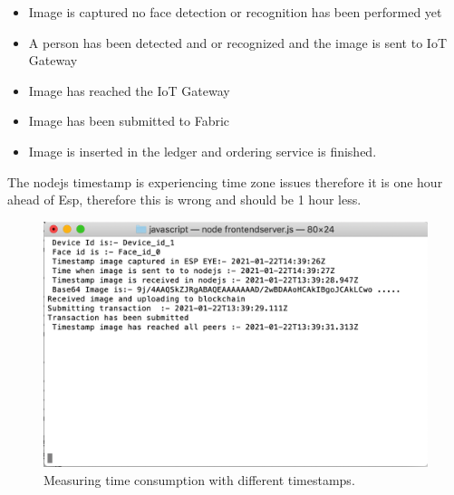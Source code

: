 \begin{itemize}
    \item Image is captured no face detection or recognition has been performed yet
    \item A person has been detected and or recognized and the image is sent to IoT Gateway
    \item Image has reached the IoT Gateway
    \item Image has been submitted to Fabric 
    \item Image is inserted in the ledger and ordering service is finished. 
\end{itemize}
The nodejs timestamp is experiencing time zone issues therefore it is one hour ahead of Esp, therefore this is wrong and should be 1 hour less. 


\begin{figure}[!htb]
    \centering
    \includegraphics[width=1\textwidth]{figures/nodejs3.png}
    \caption{Measuring time consumption with different timestamps.}
    \label{fig:time_stamp}
\end{figure}



